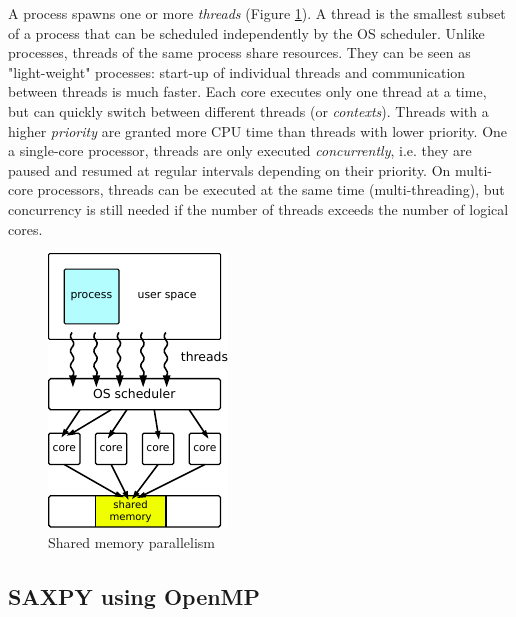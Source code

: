 A process spawns one or more \emph{threads} (Figure \ref{fig:shared}). A thread is the smallest subset of a process that can be scheduled independently by the OS scheduler. Unlike processes, threads of the same process share resources. They can be seen as "light-weight" processes: start-up of individual threads and communication between threads is much faster. Each core executes only  one thread at a time, but can quickly switch between different threads (or \emph{contexts}). Threads with a higher \emph{priority} are granted more CPU time than threads with lower priority. One a single-core processor, threads are only executed \emph{concurrently}, i.e. they are paused and resumed at regular intervals depending on their priority. On multi-core processors, threads can be executed at the same time (multi-threading), but concurrency is still needed if the number of threads exceeds the number of logical cores.

\begin{figure}[h]
\centering
\includegraphics[scale=1.4]{Pics/shared}
\caption{Shared memory parallelism}
\label{fig:shared}
\end{figure}

\subsection{SAXPY using OpenMP}

